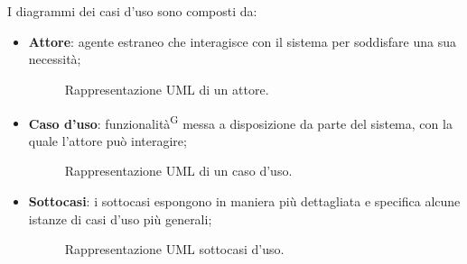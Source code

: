 \documentclass[8pt]{article}
\newcommand{\glossterm}[1]{#1\textsuperscript{G}} %
\begin{document}
\\\\
I diagrammi dei casi d'uso sono composti da:\\
\begin{itemize}
    \item \textbf{Attore}: agente estraneo che interagisce con il sistema per soddisfare una sua necessità;
        \begin{figure}[H]
            \centering
            \caption{Rappresentazione UML di un attore.}
            \label{fig:Rappresentazione UML di un attore}
        \end{figure}
    \item \textbf{Caso d'uso}: \glossterm{funzionalità} messa a disposizione da parte del sistema, con la quale l'attore può interagire;
        \begin{figure}[H]
        \centering
        \caption{Rappresentazione UML di un caso d'uso.}
        \label{fig:Rappresentazione UML di un caso d'uso}
        \end{figure}
    \item \textbf{Sottocasi}: i sottocasi espongono in maniera più dettagliata e specifica alcune istanze di casi d'uso più generali; 
    \begin{figure}[H]
        \centering
        \caption{Rappresentazione UML sottocasi d'uso.}
        \label{fig:Rappresentazione UML sottocasi d'uso}
    \end{figure}

\end{itemize}
\end{document}

